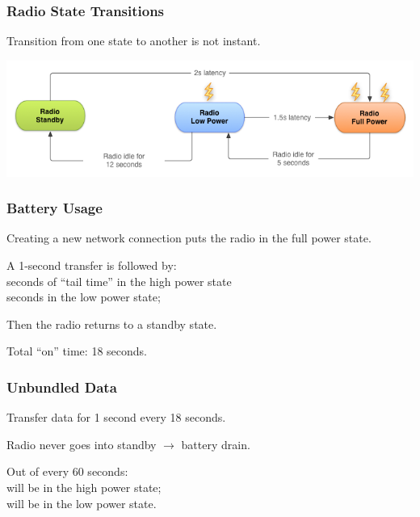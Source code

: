\begin{frame}
\frametitle{Radio State Transitions}

\begin{changemargin}{1cm}
Transition from one state to another is not instant. 
\end{changemargin}
\includegraphics[width=\textwidth]{images/mobile_radio_state_machine.png}\\

\end{frame}

\begin{frame}
\frametitle{Battery Usage}

\begin{changemargin}{1cm}

Creating a new network connection puts the radio in the full power state.

A 1-second transfer is followed by:\\
 seconds of ``tail time'' in the high power state\\
 seconds in the low power state;

Then the radio returns to a standby state.

Total ``on'' time: 18 seconds.

\end{changemargin}
\end{frame}

\begin{frame}
\frametitle{Unbundled Data}

\begin{changemargin}{1cm}

Transfer data for 1 second every 18 seconds.

Radio never goes into standby $\rightarrow$ battery drain.

Out of every 60 seconds:\\
 will be in the high power state;\\
 will be in the low power state.

\end{changemargin}
\end{frame}

